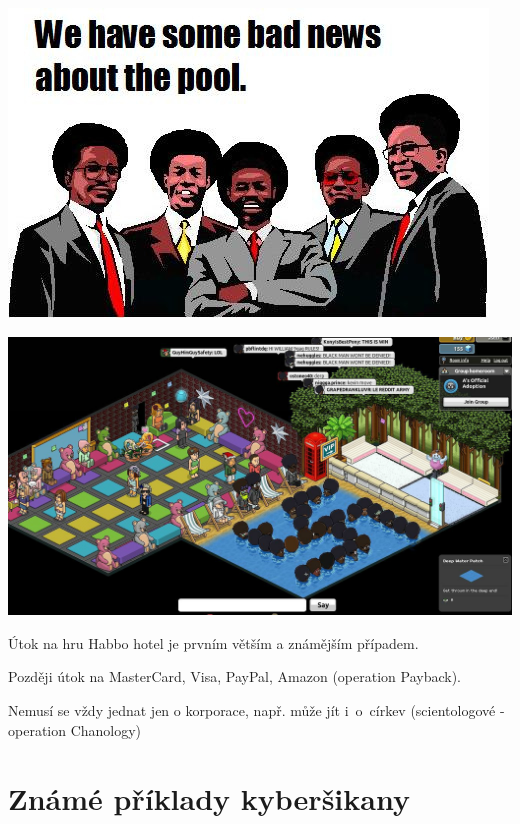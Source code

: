 \documentclass[xetex]{beamer}
\begin{document}
\begin{frame}
	\includegraphics[scale=0.6]{announce.jpg}
\end{frame}

\begin{frame}
	\includegraphics[scale=0.25]{habbo-hotel.jpg}
\end{frame}

\begin{frame}
	Útok na hru Habbo hotel je prvním větším a známějším případem.

	\bigskip

	Později útok na MasterCard, Visa, PayPal, Amazon (operation Payback).

	\bigskip

	Nemusí se vždy jednat jen o korporace, např. může jít i~o~církev (scientologové - operation Chanology)
\end{frame}

\section{Známé příklady kyberšikany}
\end{document}
